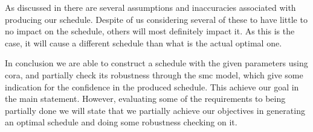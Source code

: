 As discussed in  there are several assumptions and inaccuracies associated with producing our schedule. Despite of us considering several of these to have little to no impact on the schedule, others will most definitely impact it. As this is the case, it will cause a different schedule than what is the actual optimal one.

In conclusion we are able to construct a schedule with the given parameters using \gls{cora}, and partially check its robustness through the \gls{smc} model, which give some indication for the confidence in the produced schedule. This achieve our goal in the main statement. However, evaluating some of the requirements to being partially done we will state that we partially achieve our objectives in generating an optimal schedule and doing some robustness checking on it.
